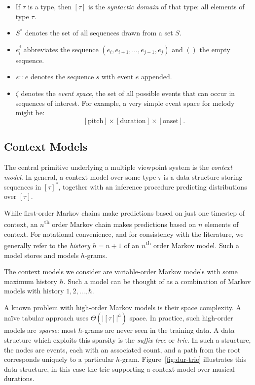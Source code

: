 \documentclass[12pt,a4paper,twoside,openright]{report}
\begin{document}
\begin{itemize}[itemsep=0mm]
  \item If $\tau$ is a type, then $[\tau]$ is the \emph{syntactic domain} of
    that type: all elements of type $\tau$.   
  \item $S^*$ denotes the set of all sequences drawn from a set $S$.
  \item $e_i^j$ abbreviates the sequence $(e_i,e_{i+1},\ldots,e_{j-1},e_j)$ and
    $()$ the empty sequence.
  \item $s :: e$ denotes the sequence $s$ with event $e$ appended.
  \item $\zeta$ denotes the \emph{event space}, the set of all possible events
    that can occur in sequences of interest. For example, a very simple event
    space for melody might be:
    $$ [\mathrm{pitch}] \times [\mathrm{duration}] \times [\mathrm{onset}]. $$
\end{itemize}

\subsection{Context Models}\label{sec:ctx-model-prep}

The central primitive underlying a multiple viewpoint system is the
\emph{context model}. In general, a context model over some type $\tau$ is
a data structure storing sequences in $[\tau]^*$, together with an inference
procedure predicting distributions over $[\tau]$.

While first-order Markov chains make predictions based on just one timestep of
context, an $n$\textsuperscript{th} order Markov chain makes predictions based
on $n$ elements of context. For notational convenience, and for consistency with
the literature, we generally refer to the \emph{history} $h = n+1$ of an
$n$\textsuperscript{th} order Markov model. Such a model stores and models
$h$-grams.

The context models we consider are variable-order Markov models with some
maximum history $\hbar$.  Such a model can be thought of as a combination of
Markov models with history $1,2,\ldots,\hbar$. 

A known problem with high-order Markov models is their space complexity. A naïve
tabular approach uses $\Theta(|[\tau]|^h)$ space.  In practice, such high-order
models are \emph{sparse}: most $h$-grams are never seen in the training data. A
data structure which exploits this sparsity is the \emph{suffix tree} or
\emph{trie}.  In such a structure, the nodes are events, each with an associated
count, and a path from the root corresponds uniquely to a particular $h$-gram.
Figure~\ref{fig:dur-trie} illustrates this data structure, in this case the trie
supporting a context model over musical durations. 
\end{document}
